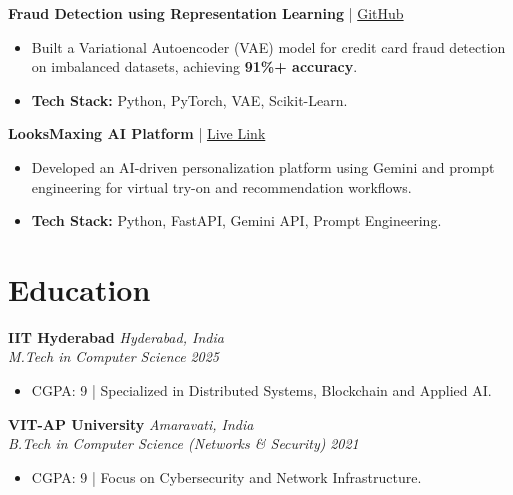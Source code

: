 \documentclass[9pt,a4paper]{extarticle}
\newcommand{\resumeItem}[1]{\item\small{#1}}
\newcommand{\resumeHeading}[4]{
  \vspace{3pt}
  \textbf{#1} \hfill \textit{#2} \\[2pt]
  \textit{#3} \hfill \textit{#4} \\[1pt]
}
\begin{document}
\textbf{Fraud Detection using Representation Learning} | \hfill \href{https://github.com/kaulmesanyam/IITH_MTech/}{GitHub}
\begin{itemize}[leftmargin=*, nosep]
    \resumeItem{Built a Variational Autoencoder (VAE) model for credit card fraud detection on imbalanced datasets, achieving \textbf{91\%+ accuracy}.}
    \resumeItem{\textbf{Tech Stack:} Python, PyTorch, VAE, Scikit-Learn.}
\end{itemize}

\textbf{LooksMaxing AI Platform} | \hfill \href{https://www.looksmaxxing.in/}{Live Link}
\begin{itemize}[leftmargin=*, nosep]
    \resumeItem{Developed an AI-driven personalization platform using Gemini and prompt engineering for virtual try-on and recommendation workflows.}
    \resumeItem{\textbf{Tech Stack:} Python, FastAPI, Gemini API, Prompt Engineering.}
\end{itemize}

\section{Education}
\resumeHeading{IIT Hyderabad}{Hyderabad, India}{M.Tech in Computer Science}{2025}
\begin{itemize}[leftmargin=*, nosep]
    \resumeItem{CGPA: 9 | Specialized in Distributed Systems, Blockchain and Applied AI.}
\end{itemize}

\resumeHeading{VIT-AP University}{Amaravati, India}{B.Tech in Computer Science (Networks \& Security)}{2021}
\begin{itemize}[leftmargin=*, nosep]
    \resumeItem{CGPA: 9 | Focus on Cybersecurity and Network Infrastructure.}
\end{itemize}

\end{document}
